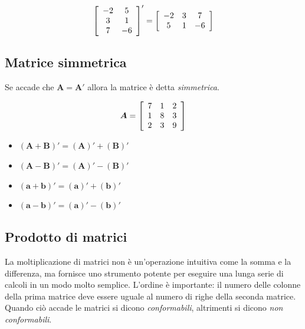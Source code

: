 \documentclass[
  11pt,
]{krantz}
\theoremstyle{definition}
\theoremstyle{definition}
\theoremstyle{definition}
\theoremstyle{definition}
\theoremstyle{remark}
\begin{document}
\[\left[ \begin{array}{c c}
-2 & 5\\
3 & 1\\
7 & -6
\end{array}
 \right]'=
\left[ \begin{array}{c c c}
-2 & 3 & 7\\
5 & 1 & -6
\end{array}
 \right]\]

\hypertarget{matrice-simmetrica}{%
\subsection{Matrice simmetrica}\label{matrice-simmetrica}}

Se accade che \(\boldsymbol{A} = \boldsymbol{A}'\) allora la matrice è detta \emph{simmetrica}.

\[\boldsymbol{A} =  \left[ \begin{array}{c c c}
7 & 1 & 2\\
1 & 8 & 3\\
2 & 3 & 9 \end{array} \right]\]

\begin{itemize}
\item
  \((\boldsymbol{A} + \boldsymbol{B})' = (\boldsymbol{A})' + (\boldsymbol{B})'\)
\item
  \((\boldsymbol{A} - \boldsymbol{B})' = (\boldsymbol{A})' - (\boldsymbol{B})'\)
\item
  \((\boldsymbol{a} + \boldsymbol{b})' = (\boldsymbol{a})' + (\boldsymbol{b})'\)
\item
  \((\boldsymbol{a} - \boldsymbol{b})' = (\boldsymbol{a})' - (\boldsymbol{b})'\)
\end{itemize}

\hypertarget{prodotto-di-matrici}{%
\subsection{Prodotto di matrici}\label{prodotto-di-matrici}}

La moltiplicazione di matrici non è un'operazione intuitiva come la somma e la differenza, ma fornisce uno strumento potente per eseguire una lunga serie di calcoli in un modo molto semplice. L'ordine è importante: il numero delle colonne della prima matrice deve essere uguale al numero di righe della seconda matrice. Quando ciò accade le matrici si dicono \emph{conformabili}, altrimenti si dicono \emph{non conformabili}.
\end{document}
